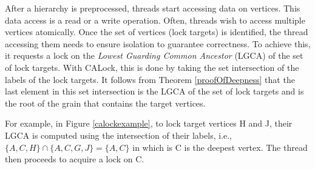 After a hierarchy is preprocessed, threads start accessing data on vertices. This data access is a read or a write operation. Often, threads wish to access multiple vertices atomically. Once the set of vertices (lock targets) is identified, the thread accessing them needs to ensure isolation to guarantee correctness. To achieve this, it requests a lock on the \emph{Lowest Guarding Common Ancestor} (LGCA) of the set of lock targets. With CALock, this is done by taking the set intersection of the labels of the lock targets. It follows from Theorem \ref{proofOfDeepness} that the last element in this set intersection is the LGCA of the set of lock targets and is the root of the grain that contains the target vertices. 

For example, in Figure \ref{calockexample}, to lock target vertices H and J, their LGCA is computed using the intersection of their labels, i.e., $\{A, C, H\} \cap \{A, C, G, J\} =  \{A,C\}$ in which is C is the deepest vertex. The thread then proceeds to acquire a lock on C. 






